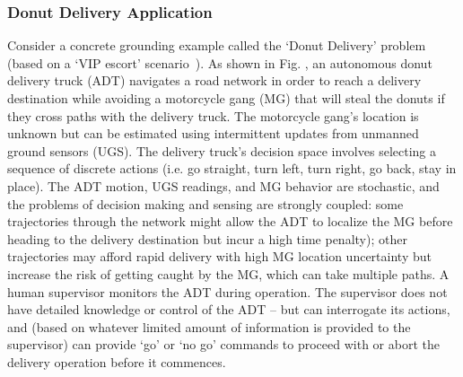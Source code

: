 \subsubsection{Donut Delivery Application} \label{sec:donut_delivery}
Consider a concrete grounding example called the `Donut Delivery' problem (based on a `VIP escort' scenario~\cite{Humphrey2012-lr}). As shown in Fig. \label{fig:RoadNet} , an autonomous donut delivery truck (ADT) navigates a road network in order to reach a delivery destination while avoiding a motorcycle gang (MG) that will steal the donuts if they cross paths with the delivery truck. The motorcycle gang's location is unknown but can be estimated using intermittent updates from unmanned ground sensors (UGS). The delivery truck's decision space involves selecting a sequence of discrete actions (i.e. go straight, turn left, turn right, go back, stay in place). The ADT motion, UGS readings, and MG behavior are stochastic, and the problems of decision making and sensing are strongly coupled: some trajectories through the network might allow the ADT to localize the MG before heading to the delivery destination but incur a high time penalty); other trajectories may afford rapid delivery with high MG location uncertainty but increase the risk of getting caught by the MG, which can take multiple paths. A human supervisor monitors the ADT during operation. The supervisor does not have detailed knowledge or control of the ADT -- but can interrogate its actions, and (based on whatever limited amount of information is provided to the supervisor) can provide `go' or `no go' commands to proceed with or abort the delivery operation before it commences. 

